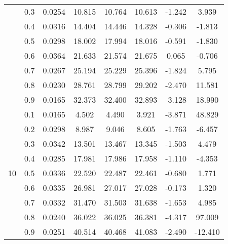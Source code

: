 \documentclass[11pt,a4paper]{report}
\begin{document}
\begin{longtable}{ | c | c || c | c | c | c | c | c | }
 & 0.3 & 0.0254 & 10.815 & 10.764 & 10.613 & -1.242 & 3.939 \\
 & 0.4 & 0.0316 & 14.404 & 14.446 & 14.328 & -0.306 & -1.813 \\
 & 0.5 & 0.0298 & 18.002 & 17.994 & 18.016 & -0.591 & -1.830 \\
 & 0.6 & 0.0364 & 21.633 & 21.574 & 21.675 & 0.065 & -0.706 \\
 & 0.7 & 0.0267 & 25.194 & 25.229 & 25.396 & -1.824 & 5.795 \\
 & 0.8 & 0.0230 & 28.761 & 28.799 & 29.202 & -2.470 & 11.581 \\
 & 0.9 & 0.0165 & 32.373 & 32.400 & 32.893 & -3.128 & 18.990 \\
 \hline
\multirow{9}{*}{10} & 0.1 & 0.0165 & 4.502 & 4.490 & 3.921 & -3.871 & 48.829 \\
 & 0.2 & 0.0298 & 8.987 & 9.046 & 8.605 & -1.763 & -6.457 \\
 & 0.3 & 0.0342 & 13.501 & 13.467 & 13.345 & -1.503 & 4.479 \\
 & 0.4 & 0.0285 & 17.981 & 17.986 & 17.958 & -1.110 & -4.353 \\
 & 0.5 & 0.0336 & 22.520 & 22.487 & 22.461 & -0.680 & 1.771 \\
 & 0.6 & 0.0335 & 26.981 & 27.017 & 27.028 & -0.173 & 1.320 \\
 & 0.7 & 0.0332 & 31.470 & 31.503 & 31.638 & -1.653 & 4.985 \\
 & 0.8 & 0.0240 & 36.022 & 36.025 & 36.381 & -4.317 & 97.009 \\
 & 0.9 & 0.0251 & 40.514 & 40.468 & 41.083 & -2.490 & -12.410 \\
 \hline
\hline
\end{longtable}
\end{document}
